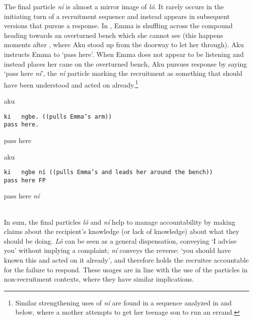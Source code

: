 \documentclass[output=paper]{langsci/langscibook}
\begin{document}
\normalsize
The final particle \textit{ní} is almost a mirror image of \textit{ló}. It rarely occurs in the initiating turn of a recruitment sequence and instead appears in subsequent versions that pursue a response. In  , Emma is shuffling across the compound heading towards an overturned bench which she cannot see (this happens moments after , where Aku stood up from the doorway to let her through). Aku instructs Emma to ‘pass here’. When Emma does not appear to be listening and instead places her cane on the overturned bench, Aku pursues response by saying ‘pass here \textit{ní}’, the \textit{ní} particle marking the recruitment as something that should have been understood and acted on already.\footnote{Similar strengthening uses of \textit{ní} are found in a sequence analyzed in  and   below, where a mother attempts to get her teenage son to run an errand.}

\vspace{2mm}
%
%
\begin{mdframednoverticalspace}[style=firstfoc]
\begin{transbox}{2}{aku}
\begin{verbatim}
ki   ngbe. ((pulls Emma’s arm))
pass here.
\end{verbatim}
pass here
\end{transbox}
\end{mdframednoverticalspace}
%
%
\begin{mdframednoverticalspace}[style=firstfoc]
\begin{transbox}{4}{aku}
\begin{verbatim}
ki   ngbe ní ((pulls Emma’s and leads her around the bench))
pass here FP
\end{verbatim}
pass here \textit{ní}
\end{transbox}
\end{mdframednoverticalspace}
%
\\

\normalsize
In sum, the final particles \textit{ló} and \textit{ní} help to manage accountability by making claims about the recipient’s knowledge (or lack of knowledge) about what they should be doing. \textit{Ló} can be seen as a general dispensation, conveying ‘I advise you’ without implying a complaint; \textit{ní} conveys the reverse: ‘you should have known this and acted on it already’, and therefore holds the recruitee accountable for the failure to respond. These usages are in line with the use of the particles in non-recruitment contexts, where they have similar implications.
\end{document}
